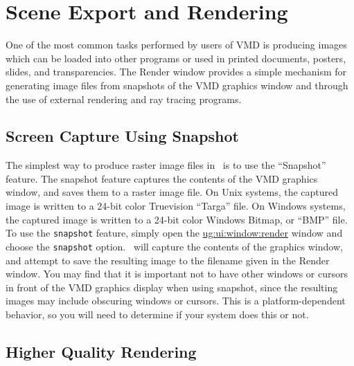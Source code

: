 %
%
%
\chapter{Scene Export and Rendering}
\label{ug:topic:rendering}

One of the most common tasks performed by users of VMD is producing
images which can be loaded into other programs or used in printed
documents, posters, slides, and transparencies.  The Render window 
provides a simple mechanism for generating image files from
snapshots of the VMD graphics window and through the use of external
rendering and ray tracing programs. 

\section{Screen Capture Using Snapshot}

The simplest way to produce raster image files in \VMD\ is to use
the ``Snapshot'' feature.  The snapshot feature captures the contents
of the VMD graphics window, and saves them to a raster image file.
On Unix systems, the captured image is written to a 24-bit color 
Truevision ``Targa'' file.  On Windows systems, the captured image is written 
to a 24-bit color Windows Bitmap, or ``BMP'' file.
To use the {\tt snapshot} feature, simply open the 
\hyperref{{\sf Render}}{{\sf Render}[\S~}{]}{ug:ui:window:render} window 
and choose the {\tt snapshot} option.  
\VMD\ will capture the contents of the graphics window, and attempt to 
save the resulting image to the filename given in the {\sf Render} window.
You may find that it is important not to have other windows or 
cursors in front of the VMD graphics display when using snapshot, 
since the resulting images may include obscuring windows or cursors.  
This is a platform-dependent behavior, so you will need to determine 
if your system does this or not.

\section{Higher Quality Rendering}

